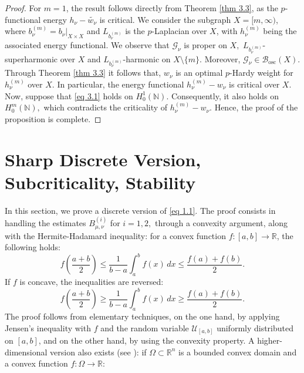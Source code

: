 \documentclass[11pt]{amsart}
\newcommand{\1}{[1]}
\begin{document}
\begin{proof}  For $m = 1$, the result follows directly from Theorem \ref{thm 3.3}, as the $p$-functional energy $h_{\nu} - \tilde{w_{\nu}}$ is critical. We consider the subgraph $X = [m, \infty)$, where $b_{\nu}^{(m)} = b_{\nu} |_{X \times X}$  and $L_{b_{\nu}^{(m)}}$ is the $p$-Laplacian over $X$, with $h_{\nu}^{(m)}$ being the associated energy functional. We observe that $\mathcal{G}_{\nu}$ is proper on $X,$ $L_{b_{\nu}^{(m)}}$-superharmonic over $X$ and $L_{b_{\nu}^{(m)}}$-harmonic on $X \setminus \{m\}$. Moreover, $\mathcal{G}_{\nu} \in \mathcal{B}_{\text{osc}}(X)$. Through Theorem \ref{thm 3.3} it follows that, $w_{\nu}$ is an optimal $p$-Hardy weight for $h_{\nu}^{(m)}$ over $X$. In particular, the energy functional $h_{\nu}^{(m)} - w_{\nu}$ is critical over $X$. Now, suppose that \eqref{eq 3.1} holds on $H_{0}^{1}(\mathbb{N}).$ Consequently, it also holds on $H_{0}^{m}(\mathbb{N}),$ which contradicts the criticality of $h_{\nu}^{(m)} - w_{\nu}$. Hence, the proof of the proposition is complete. 
\end{proof}

\section{\label{sec 4} Sharp Discrete Version, Subcriticality, Stability}

In this section, we prove a discrete version of \eqref{eq 1.1}. The proof consists in handling the estimates $B_{\mu,\nu}^{(i)}$ for $ i = 1, 2,$ through a convexity argument, along with the Hermite-Hadamard inequality: for a convex function $f : [a, b] \to \mathbb{R}$, the following holds:
$$ 
f\left(\frac{a+b}{2}\right) \leq \frac{1}{b-a} \int_a^b f(x) \, dx \leq \frac{f(a) + f(b)}{2}.
$$
If $f$ is concave, the inequalities are reversed:
$$
f\left(\frac{a+b}{2}\right) \geq \frac{1}{b-a} \int_a^b f(x) \, dx \geq \frac{f(a) + f(b)}{2}.
$$
The proof follows from elementary techniques, on the one hand, by applying Jensen's inequality with \( f \) and the random variable $\mathcal{U}_{[a,b]}$ uniformly distributed on \([a,b]\), and on the other hand, by using the convexity property. A higher-dimensional version also exists (see \cite{SB18}): if $\Omega \subset \mathbb{R}^n$ is a bounded convex domain and  a convex function $f : \Omega \to \mathbb{R}$:
\end{document}
